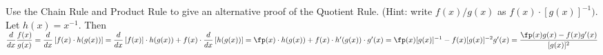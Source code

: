 {Use the Chain Rule and Product Rule to give an alternative proof of the Quotient Rule. (Hint: write $f(x)/g(x)$ as $f(x) \cdot [g(x)]^{-1})$.
}
{Let $h(x)=x^{-1}$.  Then
$\dfrac{d}{dx}\dfrac{f(x)}{g(x)}=\dfrac{d}{dx}\left[f(x)\cdot h(g(x))\right]=\dfrac{d}{dx}\left[f(x)\right]\cdot h(g(x))+f(x)\cdot\dfrac{d}{dx}\left[h(g(x))\right]=\fp(x)\cdot h(g(x))+f(x)\cdot h'(g(x))\cdot g'(x)=\fp(x)[g(x)]^{-1}-f(x)[g(x)]^{-2}g'(x)=\dfrac{\fp(x)g(x)-f(x)g'(x)}{[g(x)]^2}$
}
